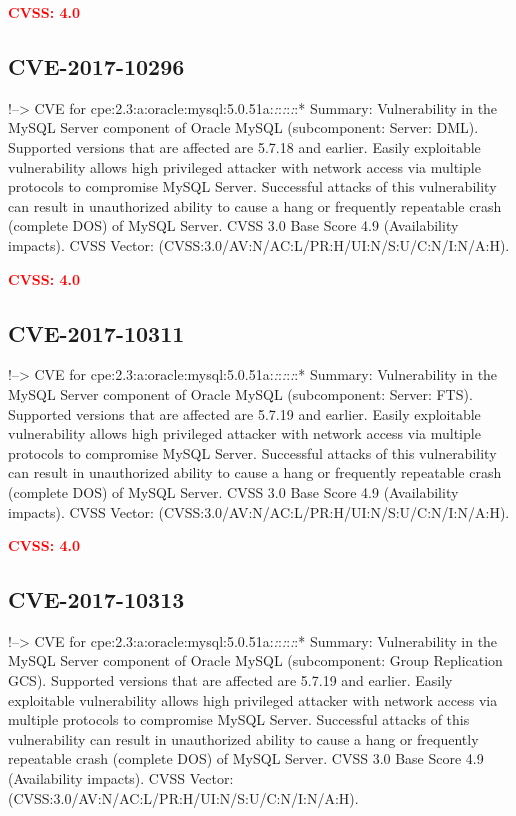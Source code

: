 \documentclass[a4paper, 12pt]{article}
\begin{document}
\textbf{\textcolor{red}{CVSS: 4.0}}

\hypertarget{cve-2017-10296}{%
\subsection{CVE-2017-10296}\label{cve-2017-10296}}

!--\textgreater{} CVE for
cpe:2.3:a:oracle:mysql:5.0.51a:\emph{:}:\emph{:}:\emph{:}:* Summary:
Vulnerability in the MySQL Server component of Oracle MySQL
(subcomponent: Server: DML). Supported versions that are affected are
5.7.18 and earlier. Easily exploitable vulnerability allows high
privileged attacker with network access via multiple protocols to
compromise MySQL Server. Successful attacks of this vulnerability can
result in unauthorized ability to cause a hang or frequently repeatable
crash (complete DOS) of MySQL Server. CVSS 3.0 Base Score 4.9
(Availability impacts). CVSS Vector:
(CVSS:3.0/AV:N/AC:L/PR:H/UI:N/S:U/C:N/I:N/A:H).

\textbf{\textcolor{red}{CVSS: 4.0}}

\hypertarget{cve-2017-10311}{%
\subsection{CVE-2017-10311}\label{cve-2017-10311}}

!--\textgreater{} CVE for
cpe:2.3:a:oracle:mysql:5.0.51a:\emph{:}:\emph{:}:\emph{:}:* Summary:
Vulnerability in the MySQL Server component of Oracle MySQL
(subcomponent: Server: FTS). Supported versions that are affected are
5.7.19 and earlier. Easily exploitable vulnerability allows high
privileged attacker with network access via multiple protocols to
compromise MySQL Server. Successful attacks of this vulnerability can
result in unauthorized ability to cause a hang or frequently repeatable
crash (complete DOS) of MySQL Server. CVSS 3.0 Base Score 4.9
(Availability impacts). CVSS Vector:
(CVSS:3.0/AV:N/AC:L/PR:H/UI:N/S:U/C:N/I:N/A:H).

\textbf{\textcolor{red}{CVSS: 4.0}}

\hypertarget{cve-2017-10313}{%
\subsection{CVE-2017-10313}\label{cve-2017-10313}}

!--\textgreater{} CVE for
cpe:2.3:a:oracle:mysql:5.0.51a:\emph{:}:\emph{:}:\emph{:}:* Summary:
Vulnerability in the MySQL Server component of Oracle MySQL
(subcomponent: Group Replication GCS). Supported versions that are
affected are 5.7.19 and earlier. Easily exploitable vulnerability allows
high privileged attacker with network access via multiple protocols to
compromise MySQL Server. Successful attacks of this vulnerability can
result in unauthorized ability to cause a hang or frequently repeatable
crash (complete DOS) of MySQL Server. CVSS 3.0 Base Score 4.9
(Availability impacts). CVSS Vector:
(CVSS:3.0/AV:N/AC:L/PR:H/UI:N/S:U/C:N/I:N/A:H).
\end{document}
